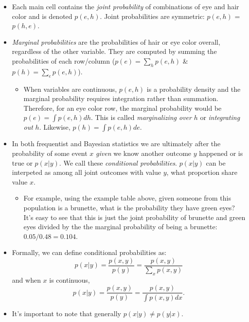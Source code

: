 \documentclass[12pt]{article}
\begin{document}
\begin{itemize}
  \item Each main cell contains the \emph{joint probability} of combinations of eye and hair color and is denoted $p(e,h)$. Joint probabilities are symmetric: $p(e,h)$ = $p(h,e)$.
  
  \item \emph{Marginal probabilities} are the probabilities of hair or eye color overall, regardless of the other variable. They are computed by summing the probabilities of each row/column ($p(e) = \sum_{h}p(e,h)$ \& $p(h) = \sum_{e}p(e,h)$).
  
  \begin{itemize}
    \item When variables are continuous, $p(e,h)$ is a probability density and the marginal probability requires integration rather than summation.  Therefore, for an eye color row, the marginal probability would be $p(e) = \int p(e,h) dh$. This is called \emph{marginalizing over} $h$ or \emph{integrating out} $h$. Likewise, $p(h) = \int p(e,h) de$.
  \end{itemize}
  
  \item In both frequentist and Bayesian statistics we are ultimately after the probability of some event $x$ \emph{given} we know another outcome $y$ happened or is true or $p(x|y)$. We call these \emph{conditional probabilities}. $p(x|y)$ can be interpeted as among all joint outcomes with value $y$, what proportion share value $x$.
  \begin{itemize}
    \item For example, using the example table above, given someone from this population is a brunette, what is the probability they have green eyes? It's easy to see that this is just the joint probability of brunette and green eyes divided by the the marginal probability of being a brunette: $0.05/0.48=0.104$.
  \end{itemize}
 \item Formally, we can define conditional probabilities as:
    \begin{equation}
      p(x|y) = \frac{p(x,y)}{p(y)} = \frac{p(x,y)}{\sum_xp(x,y)}
    \end{equation}
    and when $x$ is continuous, 
    \begin{equation}
      p(x|y) = \frac{p(x,y)}{p(y)} = \frac{p(x,y)}{\int p(x,y) dx}.
    \end{equation}
  \item It's important to note that generally $p(x|y) \neq p(y|x)$.  
\end{itemize}  
\end{document}
